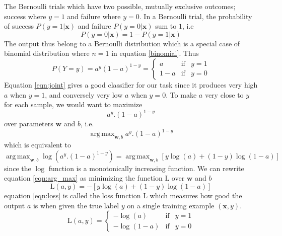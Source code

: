 \documentclass[12pt]{report}
\numberwithin{equation}{section}
\DeclareMathOperator*{\argmax}{arg\,max}
\begin{document}
The Bernoulli trials which have two possible, mutually exclusive outcomes; success where $y=1$ and failure where $y=0$. In a Bernoulli trial, the probability of success $P(y=1|\bm{x})$ and failure $P(y=0|\bm{x})$ sum to $1$, i.e 
\begin{equation}\label{eqn:trial}
P(y=0|\bm{x}) = 1 - P(y=1|\bm{x})
\end{equation}
The output thus belong to a Bernoulli distribution which is a special case of binomial distribution where $n=1$ in equation \eqref{binomial}. Thus 
\begin{equation}\label{eqn:joint}
P(Y=y) = a^y(1-a)^{1-y}=\left\{\begin{array}{lcc}
						a & \text{if} & y=1 \\
						1-a & \text{if} & y=0
						\end{array}\right.
\end{equation}
Equation \eqref{eqn:joint} gives a good classifier for our task since it produces very high $a$ when $y=1$, and conversely very low $a$ when $y=0$. To make $a$  very close to $y$ for each sample, we would want to maximize 
\[ a^y.(1-a)^{1-y} \]
over parameters $\bm{w}$ and $b$, i.e.
\[ \argmax_{\textbf{w},b} a^y.(1-a)^{1-y} \]
which is equivalent to
\begin{equation}\label{eqn:arg_max}
\argmax_{\textbf{w},b} \log(a^y.(1-a)^{1-y}) = \argmax_{\textbf{w},b} [y\log(a) + (1-y)\log(1-a)]
\end{equation}
since the $\log$ function is a monotonically increasing function. We can rewrite equation \eqref{eqn:arg_max} as minimizing the function $\mathrm{L}$ over $\bm{w}$ and $b$ 
\begin{equation}\label{eqn:loss}
\mathrm{L}(a,y) = -[y\log(a) + (1-y)\log(1-a)]
\end{equation}
equation \eqref{eqn:loss} is called the {loss function} $\mathrm{L}$ which measures how good the output $a$ is when given the true label $y$ on a single training example $(\bm{x},y)$. 
\begin{equation}\label{eqn:loss1}
\mathrm{L}(a,y)=\left\{\begin{array}{lcc}
						-\log(a) & \text{if} & y=1 \\
						-\log(1-a) & \text{if} & y=0
						\end{array}\right.
\end{equation}
\end{document}
